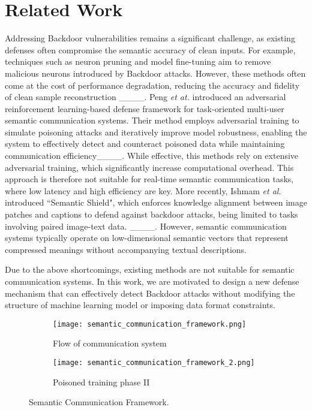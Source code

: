 \section{Related Work}
\label{related work}
Addressing Backdoor vulnerabilities remains a significant challenge, as existing defenses often compromise the semantic accuracy of clean inputs. For example, techniques such as neuron pruning and model fine-tuning aim to remove malicious neurons introduced by Backdoor attacks. However, these methods often come at the cost of performance degradation, reducing the accuracy and fidelity of clean sample reconstruction ____. Peng \emph{et at.} introduced an adversarial reinforcement learning-based defense framework for task-oriented multi-user semantic communication systems. Their method employs adversarial training to simulate poisoning attacks and iteratively improve model robustness, enabling the system to effectively detect and counteract poisoned data while maintaining communication efficiency____. While effective, this methods rely on extensive adversarial training, which significantly increase computational overhead. This approach is therefore not suitable for real-time semantic communication tasks, where low latency and high efficiency are key. More recently, Ishmam  \emph{et al.} introduced ``Semantic Shield", which enforces knowledge alignment between image patches and captions to defend against backdoor attacks, being limited to tasks involving paired image-text data. ____. However, semantic communication systems typically operate on low-dimensional semantic vectors that represent compressed meanings without accompanying textual descriptions. 

Due to the above shortcomings, existing methods are not suitable for semantic communication systems. In this work, we are motivated to design a new defense mechanism that can effectively detect Backdoor attacks without modifying the structure of machine learning model or imposing data format constraints. 

\begin{figure}[htbp]
\centering
\begin{subfigure}[b]{\linewidth}
\centering
\texttt{[image: semantic\_communication\_framework.png]}
\caption{Flow of communication system}
\end{subfigure}

\begin{subfigure}[b]{\linewidth}
\centering
\texttt{[image: semantic\_communication\_framework\_2.png]}
\caption{Poisoned training phase II}
\end{subfigure}
\caption{Semantic Communication Framework.}
\label{framework 1}

\end{figure}